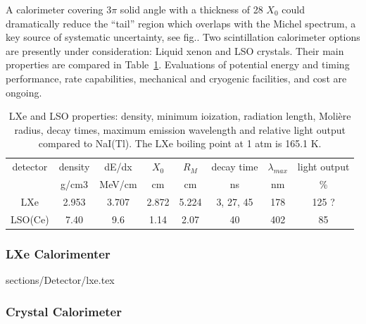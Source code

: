 A calorimeter covering 3$\pi$ solid angle with a thickness of 28 $X_0$ could dramatically reduce the ``tail” region
which overlaps with the Michel spectrum, a key source of systematic uncertainty, see fig.\cite{fig:tail}. 
Two scintillation calorimeter options are presently under consideration: Liquid xenon and LSO crystals. Their main properties are compared in 
Table~\ref{tab:calos}. Evaluations  of potential energy and timing performance, rate capabilities, mechanical and cryogenic facilities, and cost are ongoing.
\begin{table}
\center
\begin{tabular}{cccccccc}
\hline
\hline
 detector 	&  density 		& 	dE/dx	&	$X_0$ 	& 	$R_M$ 	& decay time 	& $\lambda_{max}$ 	& light output  \\
 			&	g/cm3		&	MeV/cm	&	cm		&	cm		&	ns			&	nm				&	\%		\\	
\hline
LXe			&	2.953 		&	3.707	&	2.872	&	5.224	&	3, 27, 45	&	178			&	125 ?  \\
LSO(Ce)		&	7.40			&	9.6		&	1.14	&	2.07	&	40		&	402			&	85		\\	
\hline
\hline
\end{tabular}
\caption{LXe and LSO properties: density, minimum ioization, radiation length, Moli\`ere radius, decay times, maximum emission wavelength and relative light output compared to NaI(Tl). The LXe boiling point at 1 atm is 165.1 K. }
\label{tab:calos}
\end{table}


\subsubsection{LXe Calorimenter}
 {sections/Detector/lxe.tex}

\subsubsection{Crystal Calorimeter}
